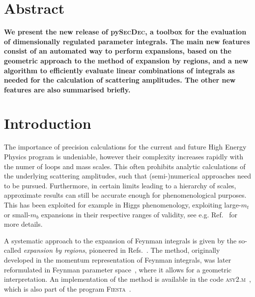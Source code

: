 \documentclass[Physsubmission, Phys]{SciPost}
\newcommand{\pysecdec}{py{\textsc{SecDec}}}
\begin{document}
\section*{Abstract}
{\bf
We present the new release of \pysecdec{}, a toolbox for the
evaluation of dimensionally regulated parameter integrals. The main
new features consist of an automated way to perform expansions, based
on the geometric approach to the method of expansion by regions, and a
new algorithm to efficiently evaluate linear combinations of integrals
as needed for the calculation of scattering amplitudes. The other new features are also summarised briefly.
}




\section{Introduction}
\label{sec:intro}

The importance of precision calculations for the current and future High Energy Physics program is undeniable,
however their complexity increases rapidly with the numer of loops and mass scales.
This often prohibits analytic calculations of the underlying scattering amplitudes, such that (semi-)numerical approaches need to be pursued.
Furthermore, in certain limits leading to a hierarchy of scales, approximate results can still be accurate enough for phenomenological purposes.
This has been exploited for example in Higgs phenomenology, exploiting large-$m_t$ or small-$m_b$ expansions in their respective ranges of validity, see e.g. Ref.~\cite{Heinrich:2020ybq} for more details.

A systematic approach to the expansion of Feynman integrals is given by the so-called {\em expansion by regions}, pioneered in Refs.~\cite{Smirnov:1991jn,Beneke:1997zp,Smirnov:1998vk}. The method, originally developed in the momentum representation of Feynman integrals, was later reformulated in Feynman parameter space~\cite{Smirnov:1999bza,Pak:2010pt,Ananthanarayan:2018tog,Ananthanarayan:2020ptw}, where it allows for a geometric interpretation.
An implementation of the method is available in the code \textsc{asy2.m}~\cite{Jantzen:2012mw}, which is also part of the program \textsc{Fiesta}~\cite{Smirnov:2008py,Smirnov:2009pb,Smirnov:2013eza,Smirnov:2015mct,Smirnov:2021rhf}.
\end{document}
